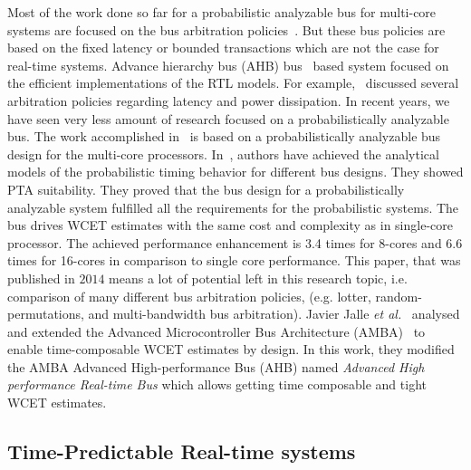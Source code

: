 Most of the work done so far for a probabilistic analyzable bus for multi-core systems are focused on the bus arbitration policies~\cite{lahiri2001lotterybus, udipi2010towards}. But these bus policies are based on the fixed latency or bounded transactions which are not the case for real-time systems. Advance hierarchy bus (AHB) bus~\cite{ARM} based system focused on the efficient implementations of the RTL models. For example,~\cite{conti2004performance} discussed several arbitration policies regarding latency and power dissipation. In recent years, we have seen very less amount of research focused on a probabilistically analyzable bus. The work accomplished in~\cite{Jalle:2014:BDT:2616606.2616668} is based on a probabilistically analyzable bus design for the multi-core processors. In~\cite{jalle2014ahrb}, authors have achieved the analytical models of the probabilistic timing behavior for different bus designs. They showed PTA suitability. They proved that the bus design for a probabilistically analyzable system fulfilled all the requirements for the probabilistic systems. The bus drives WCET estimates with the same cost and complexity as in single-core processor. The achieved performance enhancement is 3.4 times for 8-cores and 6.6 times for 16-cores in comparison to single core performance. This paper, that was published in $2014$ means a lot of potential left in this research topic, i.e. comparison of many different bus arbitration policies, (e.g. lotter, random-permutations, and multi-bandwidth bus arbitration). Javier Jalle \emph{et al.}~\cite{Jalle:2014:BDT:2616606.2616668} analysed and extended the Advanced Microcontroller Bus Architecture (AMBA)~\cite{jalle2014ahrb} to enable time-composable WCET estimates by design. In this work, they modified the AMBA Advanced High-performance Bus (AHB) named \textit{Advanced High performance Real-time Bus} which allows getting time  composable and tight WCET estimates. 

 

\subsection{Time-Predictable Real-time systems}


